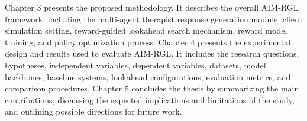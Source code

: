Chapter 3 presents the proposed methodology. It describes the overall AIM-RGL framework, including the multi-agent therapist response generation module, client simulation setting, reward-guided lookahead search mechanism, reward model training, and policy optimization process. Chapter 4 presents the experimental design and results used to evaluate AIM-RGL. It includes the research questions, hypotheses, independent variables, dependent variables, datasets, model backbones, baseline systems, lookahead configurations, evaluation metrics, and comparison procedures. Chapter 5 concludes the thesis by summarizing the main contributions, discussing the expected implications and limitations of the study, and outlining possible directions for future work.